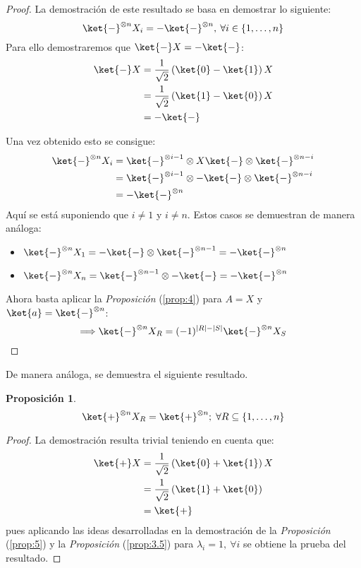 \documentclass[10pt,conference,a4paper]{IEEEtran}
\newtheorem{prop}{Proposición}[section]
\providecommand{\abs}[1]{\lvert#1\rvert}
\begin{document}
\begin{proof}
    La demostración de este resultado se basa en demostrar lo siguiente:
    $$ \ket{-}^{\otimes n} X_i =  -\ket{-}^{\otimes n},\:\forall i\in \{1,\ldots, n\}$$
    Para ello demostraremos que $\ket{-}X=-\ket{-}$:
    \begin{align*}
        \ket{-}X&=\dfrac{1}{\sqrt{2}}\left(\ket{0}-\ket{1}\right)X\\
        &=\dfrac{1}{\sqrt{2}}\left(\ket{1}-\ket{0}\right)X\\
        &=-\ket{-}
    \end{align*}
    
Una vez obtenido esto se consigue:
\begin{align*}
    \ket{-}^{\otimes n}X_i&=\ket{-}^{\otimes i-1}\otimes X\ket{-}\otimes\ket{-}^{\otimes n-i}\\
    &=\ket{-}^{\otimes i-1}\otimes -\ket{-}\otimes\ket{-}^{\otimes n-i}\\
    &=-\ket{-}^{\otimes n}
\end{align*}
Aquí se está suponiendo que $i\neq 1$ y $i\neq n$. Estos casos se demuestran de manera análoga:
\vspace{2mm}
\begin{itemize}
    \item $\ket{-}^{\otimes n}X_1=-\ket{-}\otimes\ket{-}^{\otimes n-1}=-\ket{-}^{\otimes n}$
    \vspace{2mm}
    \item $\ket{-}^{\otimes n}X_n=\ket{-}^{\otimes n-1}\otimes-\ket{-}=-\ket{-}^{\otimes n}$
\end{itemize}
\vspace{2mm}
Ahora basta aplicar la \textit{Proposición} (\ref{prop:4}) para $A=X$ y \\
$\ket{a}=\ket{-}^{\otimes n}$:
$$\Longrightarrow  \ket{-}^{\otimes n} X_R=(-1)^{\abs{R}-\abs{S}}\ket{-}^{\otimes n}X_S$$
\end{proof}
\vspace{1.5mm}
De manera análoga, se demuestra el siguiente resultado.
\vspace{1.5mm}
\begin{prop}
\begin{equation}
   \ket{+}^{\otimes n} X_R=\ket{+}^{\otimes n};\; \forall R\subseteq \{1,\ldots,n\} 
\end{equation}
    \label{prop:6}
\end{prop}
\begin{proof}
    La demostración resulta trivial teniendo en cuenta que:
    \begin{align*}
        \ket{+}X&=\dfrac{1}{\sqrt{2}}\left(\ket{0}+\ket{1}\right)X\\
        &=\dfrac{1}{\sqrt{2}}\left(\ket{1}+\ket{0}\right)\\
        &=\ket{+}
    \end{align*}
    pues aplicando las ideas desarrolladas en la demostración de la \textit{Proposición} (\ref{prop:5}) y la \textit{Proposición} (\ref{prop:3.5}) para $\lambda_i=1,\ \forall i$ se obtiene la prueba del resultado.
\end{proof}
\end{document}
